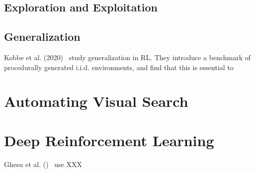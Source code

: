 \subsection{Exploration and Exploitation}



\subsection{Generalization}




Kobbe et al. (2020)~\cite{} study generalization in RL. They introduce a benchmark of procedurally generated i.i.d. environments, and find that this is essential to 


\section{Automating Visual Search}



\section{Deep Reinforcement Learning}

Ghesu et al. ()~\cite{ghesu_multi-scale_2019} use XXX